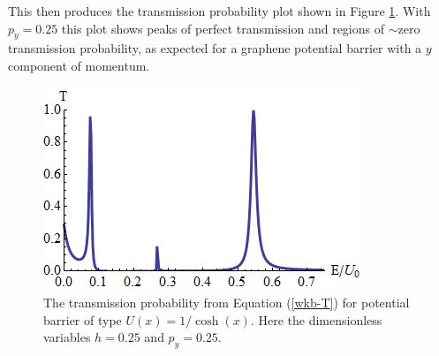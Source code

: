		This then produces the transmission probability plot shown in Figure \ref{wkb-transmission}. With $p_{y}=0.25$ this plot shows peaks of perfect transmission and regions of $\sim$zero transmission probability, as expected for a graphene potential barrier with a $y$ component of momentum.
		\begin{figure}[h]
			\centerline{\includegraphics[scale=0.6]{images/wkb-transmission}}
			\caption{The transmission probability from Equation (\ref{wkb-T}) for potential barrier of type $U\left(x\right)=1/\cosh(x)$. Here the dimensionless variables $h=0.25$ and $p_{y}=0.25$.}
			\label{wkb-transmission}
		\end{figure}

